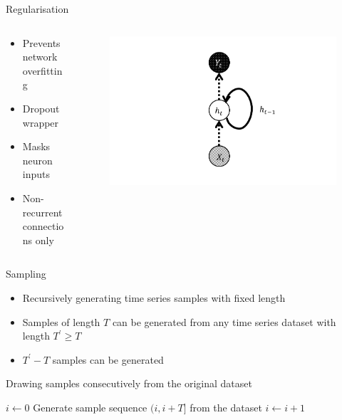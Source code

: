 \documentclass{beamer}
\begin{document}
\begin{frame}{Regularisation}
\begin{columns}[T] %
\begin{column}{.58\textwidth}
\begin{itemize}
  \item Prevents network overfitting
  \item Dropout wrapper \cite{srivastava2014}
  \item Masks neuron inputs
  \item Non-recurrent connections only \cite{zaremba2014}
\end{itemize}
\end{column}%
\hfill%
\begin{column}{.38\textwidth}
\begin{figure}[H]
	\centering
	\includegraphics[width=1\textwidth]{dropout.PNG}
\end{figure}
\end{column}%
\end{columns}
\end{frame}

\begin{frame}{Sampling}
  \begin{itemize}
    \item Recursively generating time series samples with fixed length
    \item Samples of length \(T\) can be generated from any time series dataset with length \(T^{'} \geq T \)
    \item \(T^{'}-T\) samples can be generated
  \end{itemize}
  
  
  \begin{algorithm}[H]
  	\label{consecutive_sampling}
  	\caption{Drawing samples consecutively from the original dataset}
  	\(i\leftarrow 0\) \;
  	 {
  		Generate sample sequence \((i, i+T]\) from the dataset\;
  		\(i\leftarrow i+1\)\;
  	}
  \end{algorithm}
\end{frame}
\end{document}
